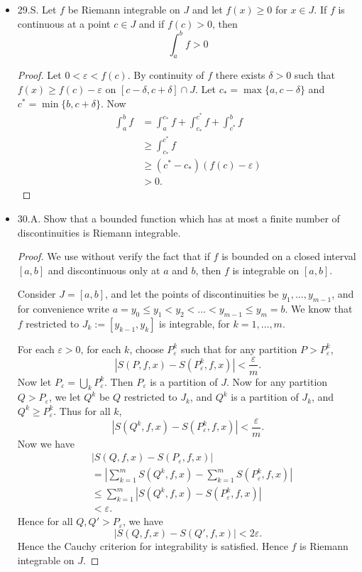 \begin{itemize}
\item 29.S. Let $f$ be Riemann integrable on $J$ and let $f(x) \geq 0$ for $x \in J$. If $f$ is continuous at a point $c \in J$ and if $f(c)>0$, then
\[
\int_a^b f>0
\]
\begin{proof}
	Let $0 < \varepsilon < f(c)$. By continuity of $f$ there exists $\delta>0$ such that $f(x) \ge  f(c) - \varepsilon$ on $[c - \delta, c+\delta] \cap J$. Let $c_* = \max \{a, c - \delta\} $ and $c^* = \min \{b, c+\delta\} $. Now
	\begin{align*}
		\int _a^b f 
		&= \int_a^{c_*} f + \int _{c_*}^{c^*}f + \int _{c^*}^b f \\
		&\ge \int _{c_*}^{c^*}f \\
		&\ge (c^* - c_*) \left( f(c) - \varepsilon \right)  \\
		&>0
	.\end{align*}
\end{proof}

\item 30.A. Show that a bounded function which has at most a finite number of discontinuities is Riemann integrable.
\begin{proof}
	We use without verify the fact that if $f$ is bounded on a closed interval  $[a,b]$ and discontinuous only at $a$ and $b$, then $f$ is integrable on $[a,b]$.

	Consider $J = [a, b]$, and let the points of discontinuities be $y_1, \ldots, y_{m-1}$, and for convenience write $a = y_0 \le y_1<y_2<\ldots < y_{m-1} \le y_m = b$. We know that $f$ restricted to $J_k := [y_{k-1}, y_k]$ is integrable, for $k = 1, \ldots, m$.  

For each $\varepsilon>0$, for each $k$, choose $P_{\varepsilon}^k$ such that for any partition $P>P_\varepsilon^k$,
\[
	\left| S(P,f, x) - S(P_\varepsilon^k, f, x) \right| < \frac{\varepsilon}{m} 
.\] 
Now let $P_\varepsilon = \bigcup_{k} P_\varepsilon^k$. Then $P_\varepsilon$ is a partition of $J$. Now for any partition $Q > P_\varepsilon$, we let $Q^k$ be $Q$ restricted to $J_k$, and $Q^k$ is a partition of $J_k$, and $Q^k \ge P_\varepsilon^k$. Thus for all $k$,
\[
	\left| S(Q^k, f, x) -  S(P_\varepsilon^k, f, x) \right| < \frac{\varepsilon}{m}
.\] 
Now we have
\begin{align*}
	&\left| S(Q, f, x) -  S(P_\varepsilon, f, x)\right| \\
	&= \left| \sum_{k=1}^{m} S(Q^k, f, x) - \sum_{k=1}^{m} S(P_\varepsilon^k, f, x) \right|  \\
	&\le \sum_{k=1}^{m} \left| S(Q^k, f, x) -  S(P_\varepsilon^k, f, x) \right| \\
	&< \varepsilon
.\end{align*}
Hence for all $Q, Q' > P_\varepsilon$, we have
\[
	\left| S(Q, f, x) - S(Q', f, x) \right| < 2 \varepsilon
.\] 
Hence the Cauchy criterion for integrability is satisfied. Hence $f$ is Riemann integrable on $J$.
\end{proof}



\end{itemize}
